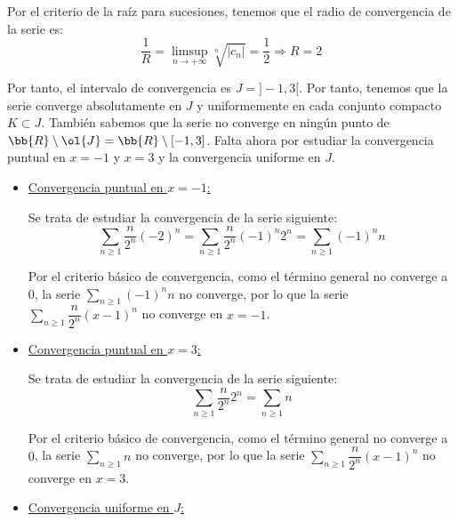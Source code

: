 \begin{ejercicio}
\begin{enumerate}
        Por el criterio de la raíz para sucesiones, tenemos que el radio de convergencia de la serie es:
        \begin{equation*}
            \frac{1}{R} = \limsup_{n\to +\infty}\sqrt[n]{\left|c_n\right|} = \frac{1}{2} \Longrightarrow R = 2
        \end{equation*}

        Por tanto, el intervalo de convergencia es $J=]-1, 3[$. Por tanto, tenemos que la serie converge absolutamente en $J$
        y uniformemente en cada conjunto compacto $K\subset J$. También sabemos que la serie no converge en ningún
        punto de $\bb{R}\setminus \ol{J}=\bb{R}\setminus [-1, 3]$. Falta ahora por estudiar la convergencia puntual en $x=-1$ y $x=3$ y la convergencia uniforme en $J$.

        \begin{itemize}
            \item \ul{Convergencia puntual en $x=-1$:}
            
            Se trata de estudiar la convergencia de la serie siguiente:
            \begin{equation*}
                \sum\limits_{n\geq 1}\dfrac{n}{2^n}(-2)^n
                = \sum\limits_{n\geq 1}\dfrac{n}{2^n}(-1)^n2^n = \sum\limits_{n\geq 1}(-1)^n n
            \end{equation*}
            
            Por el criterio básico de convergencia, como el término general no converge a $0$, la serie $\sum\limits_{n\geq 1}(-1)^n n$ no converge, por lo que la serie $\sum\limits_{n\geq 1} \dfrac{n}{2^n}(x-1)^n$ no converge en $x=-1$.

            \item \ul{Convergencia puntual en $x=3$:}
            
            Se trata de estudiar la convergencia de la serie siguiente:
            \begin{equation*}
                \sum\limits_{n\geq 1}\dfrac{n}{2^n}2^n
                = \sum\limits_{n\geq 1}n
            \end{equation*}

            Por el criterio básico de convergencia, como el término general no converge a $0$, la serie $\sum\limits_{n\geq 1} n$ no converge, por lo que la serie $\sum\limits_{n\geq 1} \dfrac{n}{2^n}(x-1)^n$ no converge en $x=3$.
            \item \ul{Convergencia uniforme en $J$:}
            

\end{itemize}
\end{enumerate}
\end{ejercicio}
